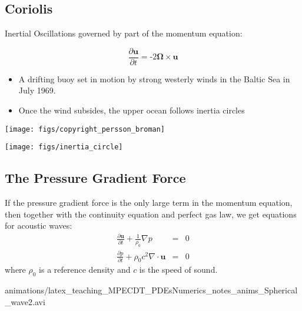 \subsection{Coriolis}

Inertial Oscillations governed by part of the momentum equation:

\begin{minipage}[c]{0.35\columnwidth}%
\[
\frac{\partial\mathbf{u}}{\partial t}=\text{-}2\bm{\Omega}\times\mathbf{u}
\]

\begin{itemize}
\item \begin{flushleft}
A drifting buoy set in motion by strong westerly winds in the Baltic
Sea in July 1969. 
\par\end{flushleft}
\item \begin{flushleft}
Once the wind subsides, the upper ocean follows inertia circles
\par\end{flushleft}
\end{itemize}
\texttt{[image: figs/copyright\_persson\_broman]}%
\end{minipage}\hfill{}%
\begin{minipage}[c]{0.6\columnwidth}%
\texttt{[image: figs/inertia\_circle]}%
\end{minipage}


\subsection{The Pressure Gradient Force}

\begin{minipage}[c]{0.48\columnwidth}%
If the pressure gradient force is the only large term in the momentum
equation, then together with the continuity equation and perfect gas
law, we get equations for acoustic waves:
\begin{eqnarray*}
\frac{\partial\mathbf{u}}{\partial t}+\frac{1}{\rho_{0}}\nabla p & = & 0\\
\frac{\partial p}{\partial t}+\rho_{0}c^{2}\nabla\cdot\mathbf{u} & = & 0
\end{eqnarray*}
where $\rho_{0}$ is a reference density and $c$ is the speed of
sound.%
\end{minipage}\hfill{}%
\begin{minipage}[c]{0.48\columnwidth}%
{animations/latex_teaching_MPECDT_PDEsNumerics_notes_anims_Spherical_wave2.avi}%
\end{minipage}

